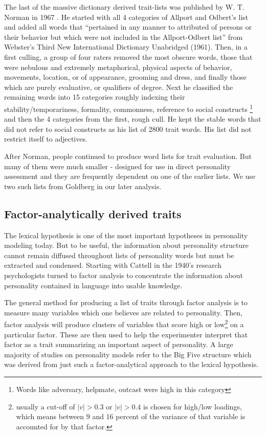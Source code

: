 \documentclass[eric_thesis.tex]{subfiles}
\begin{document}
The last of the massive dictionary derived trait-lists was published by W. T. 
Norman in 1967 . He started with all 4 categories of
Allport and Odbert's list and added all words that ``pertained in any
manner to attributed of persons or their behavior but which were not included 
in the Allport-Odbert list'' from Webster's Third New International Dictionary
Unabridged (1961). Then, in a first culling, a group of four raters removed 
the most obscure words, 
those that were
nebulous and extremely metaphorical, physical aspects of behavior, movements,
location, or of appearance, grooming and dress, and finally those which are
purely evaluative, or qualifiers of degree. Next he
classified the remaining words into 15 categories roughly indexing their
stability/temporariness, formality, commonness, reference to social constructs
\footnote{Words like adversary, helpmate, outcast were high in this category}
and then the 4 categories from the first, rough cull. He kept the stable words
that did not refer to social constructs as his list of 2800 trait words. His
list did not restrict itself to adjectives.

After Norman, people continued to produce word lists for trait evaluation. But
many of them were much smaller - designed for use in direct personality 
assessment and they are frequently dependent on one of the earlier lists. We
use two such lists from Goldberg in our later analysis. 

\subsection{Factor-analytically derived traits}

The lexical hypothesis is one of the most important hypotheses in personality
modeling today. But to be useful, the information about personality structure
cannot remain diffused throughout lists of personality words but must be 
extracted and condensed. Starting with Cattell in the 1940's  research psychologists turned to factor analysis to 
concentrate the information about personality contained in language into usable
knowledge.

The general method for producing a list of traits through factor analysis is to
measure many variables which one believes are related to personality. Then,
factor analysis will produce clusters of variables that score high or 
low\footnote{usually a cut-off of 
$\left|v\right| > 0.3$ or $\left|v\right| > 0.4$
is chosen for high/low loadings, which means between 9 and 16 percent of the
variance of that variable is accounted for by that factor.} on
a particular factor. These are then used to help the experimenter interpret
that factor as a trait summarizing an important aspect of personality. 
A large majority of studies on personality models 
refer to the Big Five structure  which was
derived from just such a factor-analytical approach to the lexical hypothesis.
\end{document}
